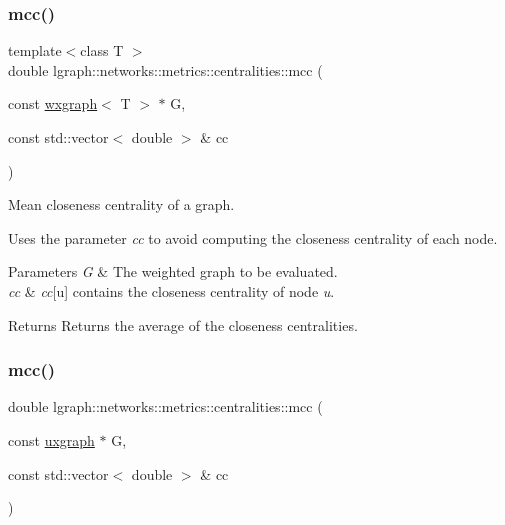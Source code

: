 \subsubsection{\texorpdfstring{mcc()}{mcc()}\hspace{0.1cm}{\footnotesize\ttfamily [3/4]}}
{\footnotesize\ttfamily template$<$class T $>$ \\
double lgraph\+::networks\+::metrics\+::centralities\+::mcc (\begin{DoxyParamCaption}\item[{const \hyperlink{classlgraph_1_1wxgraph}{wxgraph}$<$ T $>$ $\ast$}]{G,  }\item[{const std\+::vector$<$ double $>$ \&}]{cc }\end{DoxyParamCaption})}



Mean closeness centrality of a graph. 

Uses the parameter {\itshape cc} to avoid computing the closeness centrality of each node.


\begin{DoxyParams}{Parameters}
{\em G} & The weighted graph to be evaluated. \\
\hline
{\em cc} & {\itshape cc}\mbox{[}u\mbox{]} contains the closeness centrality of node {\itshape u}. \\
\hline
\end{DoxyParams}
\begin{DoxyReturn}{Returns}
Returns the average of the closeness centralities. 
\end{DoxyReturn}
\mbox{\label{namespacelgraph_1_1networks_1_1metrics_1_1centralities_add884e5cdd51eed7c46e064338361ee6}} 
\subsubsection{\texorpdfstring{mcc()}{mcc()}\hspace{0.1cm}{\footnotesize\ttfamily [4/4]}}
{\footnotesize\ttfamily double lgraph\+::networks\+::metrics\+::centralities\+::mcc (\begin{DoxyParamCaption}\item[{const \hyperlink{classlgraph_1_1uxgraph}{uxgraph} $\ast$}]{G,  }\item[{const std\+::vector$<$ double $>$ \&}]{cc }\end{DoxyParamCaption})}



